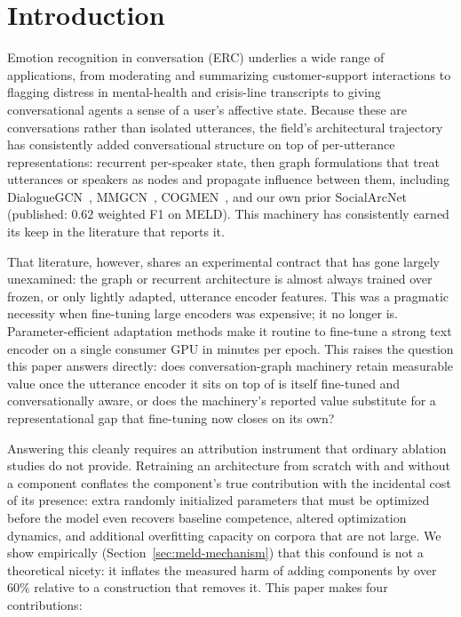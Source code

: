 \section{Introduction}
\label{sec:introduction}

Emotion recognition in conversation (ERC) underlies a wide range of applications, from moderating and summarizing customer-support interactions to flagging distress in mental-health and crisis-line transcripts to giving conversational agents a sense of a user's affective state. Because these are conversations rather than isolated utterances, the field's architectural trajectory has consistently added conversational structure on top of per-utterance representations: recurrent per-speaker state, then graph formulations that treat utterances or speakers as nodes and propagate influence between them, including DialogueGCN~\cite{dialoguegcn2019}, MMGCN~\cite{mmgcn2021}, COGMEN~\cite{cogmen2022}, and our own prior SocialArcNet~\cite{socialarcnet2026} (published: $0.62$ weighted F1 on MELD). This machinery has consistently earned its keep in the literature that reports it.

That literature, however, shares an experimental contract that has gone largely unexamined: the graph or recurrent architecture is almost always trained over frozen, or only lightly adapted, utterance encoder features. This was a pragmatic necessity when fine-tuning large encoders was expensive; it no longer is. Parameter-efficient adaptation methods make it routine to fine-tune a strong text encoder on a single consumer GPU in minutes per epoch. This raises the question this paper answers directly: does conversation-graph machinery retain measurable value once the utterance encoder it sits on top of is itself fine-tuned and conversationally aware, or does the machinery's reported value substitute for a representational gap that fine-tuning now closes on its own?

Answering this cleanly requires an attribution instrument that ordinary ablation studies do not provide. Retraining an architecture from scratch with and without a component conflates the component's true contribution with the incidental cost of its presence: extra randomly initialized parameters that must be optimized before the model even recovers baseline competence, altered optimization dynamics, and additional overfitting capacity on corpora that are not large. We show empirically (Section~\ref{sec:meld-mechanism}) that this confound is not a theoretical nicety: it inflates the measured harm of adding components by over $60\%$ relative to a construction that removes it. This paper makes four contributions:

